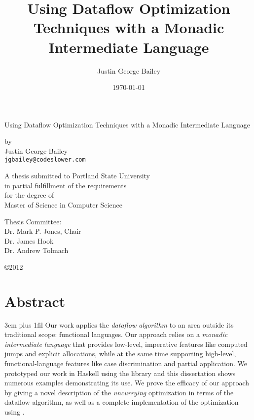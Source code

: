 \dodocclass


\thispagestyle{empty}
\date{\today}
\author{Justin George Bailey}
\title{Using Dataflow Optimization Techniques with a Monadic Intermediate Language}
\par\begin{centering}{\Large
Using Dataflow Optimization Techniques with
a Monadic Intermediate Language} \par

by \\
Justin George Bailey\\
\texttt{jgbailey@codeslower.com}\par\vfill

\begin{singlespace}
A thesis submitted to Portland State University \\ 
in partial fulfillment of the requirements \\
for the degree of\\
Master of Science in Computer Science\vfill

Thesis Committee:\\
Dr. Mark P. Jones, Chair\\
Dr. James Hook\\
Dr. Andrew Tolmach\par\vfill

\copyright2012
\end{singlespace}
\end{centering}
\newpage

\pagestyle{plain}
\section*{Abstract}
{%
\parfillskip 3em plus 1fil%
Our work applies the \emph{dataflow algorithm} to an area outside its
traditional scope: functional languages. Our approach relies on
a \emph{monadic intermediate language} that provides low-level,
imperative features like computed jumps and explicit allocations,
while at the same time supporting high-level, functional-language
features like case discrimination and partial application. We
prototyped our work in Haskell using the \hoopl library and this
dissertation shows numerous examples demonstrating its use. We prove
the efficacy of our approach by giving a novel description of
the \emph{uncurrying} optimization in terms of the dataflow algorithm, as
well as a complete implementation of the optimization using \hoopl.\par}
\newpage

